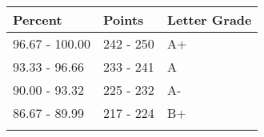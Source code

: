 \documentclass[
]{article}
\begin{document}
\begin{longtable}[]{@{}lll@{}}
\toprule
\begin{minipage}[b]{0.20\columnwidth}\raggedright
Percent\strut
\end{minipage} & \begin{minipage}[b]{0.14\columnwidth}\raggedright
Points\strut
\end{minipage} & \begin{minipage}[b]{0.16\columnwidth}\raggedright
Letter Grade\strut
\end{minipage}\tabularnewline
\midrule
\endhead
\begin{minipage}[t]{0.20\columnwidth}\raggedright
96.67 - 100.00\strut
\end{minipage} & \begin{minipage}[t]{0.14\columnwidth}\raggedright
242 - 250\strut
\end{minipage} & \begin{minipage}[t]{0.16\columnwidth}\raggedright
A+\strut
\end{minipage}\tabularnewline
\begin{minipage}[t]{0.20\columnwidth}\raggedright
93.33 - 96.66\strut
\end{minipage} & \begin{minipage}[t]{0.14\columnwidth}\raggedright
233 - 241\strut
\end{minipage} & \begin{minipage}[t]{0.16\columnwidth}\raggedright
A\strut
\end{minipage}\tabularnewline
\begin{minipage}[t]{0.20\columnwidth}\raggedright
90.00 - 93.32\strut
\end{minipage} & \begin{minipage}[t]{0.14\columnwidth}\raggedright
225 - 232\strut
\end{minipage} & \begin{minipage}[t]{0.16\columnwidth}\raggedright
A-\strut
\end{minipage}\tabularnewline
\begin{minipage}[t]{0.20\columnwidth}\raggedright
86.67 - 89.99\strut
\end{minipage} & \begin{minipage}[t]{0.14\columnwidth}\raggedright
217 - 224\strut
\end{minipage} & \begin{minipage}[t]{0.16\columnwidth}\raggedright
B+\strut
\end{minipage}\tabularnewline
\begin{minipage}[t]{0.20\columnwidth}\raggedright

\end{minipage}
\end{longtable}
\end{document}
